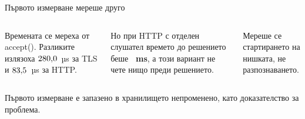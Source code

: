 \documentclass[aspectratio=169, 11pt]{beamer}
\newcommand{\code}[1]{{\ttfamily #1}}
\begin{document}
\begin{frame}{Първото измерване мереше друго}
\begin{columns}[T]
Времената се мереха от \code{accept()}. Разликите излязоха
$280{,}0$~µs за TLS и $83{,}5$~µs за HTTP.\par\medskip
Но при HTTP с отделен слушател времето до решението беше
\textbf{\winfirstClearDedicatedDecideMedian{}~ms}, а този вариант не чете нищо преди решението.\par\medskip
Мереше се стартирането на нишката, не разпознаването.
\end{columns}
\vspace{0.8em}
{\small Първото измерване е запазено в хранилището непроменено, като доказателство за проблема.\par}
\end{frame}
\end{document}
